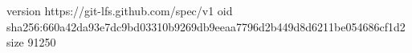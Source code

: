 version https://git-lfs.github.com/spec/v1
oid sha256:660a42da93e7dc9bd03310b9269db9eeaa7796d2b449d8d6211be054686cf1d2
size 91250
